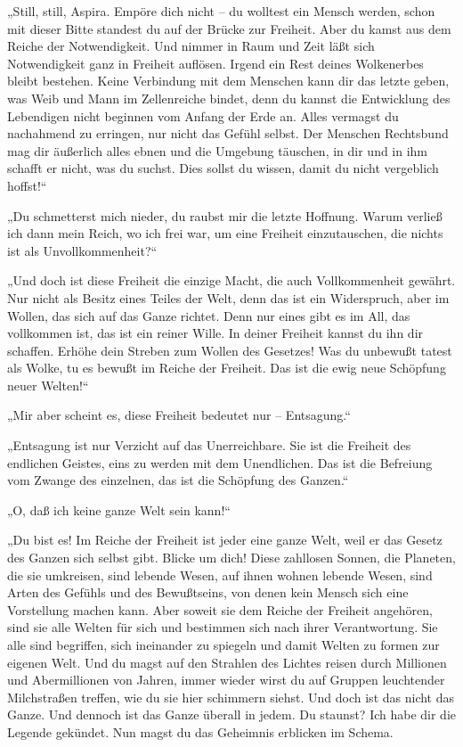 „Still, still, Aspira. Empöre dich nicht – du wolltest ein Mensch
werden, schon mit dieser Bitte standest du auf der Brücke zur
Freiheit. Aber du kamst aus dem Reiche der Notwendigkeit. Und
nimmer in Raum und Zeit läßt sich Notwendigkeit ganz in Freiheit
auflösen. Irgend ein Rest deines Wolkenerbes bleibt bestehen. Keine
Verbindung mit dem Menschen kann dir das letzte geben, was Weib und
Mann im Zellenreiche bindet, denn du kannst die Entwicklung des
Lebendigen nicht beginnen vom Anfang der Erde an. Alles vermagst du
nachahmend zu erringen, nur nicht das Gefühl selbst. Der Menschen
Rechtsbund mag dir äußerlich alles ebnen und die Umgebung täuschen,
in dir und in ihm schafft er nicht, was du suchst. Dies sollst du
wissen, damit du nicht vergeblich hoffst!“

„Du schmetterst mich nieder, du raubst mir die letzte Hoffnung.
Warum verließ ich dann mein Reich, wo ich frei war, um eine
Freiheit einzutauschen, die nichts ist als Unvollkommenheit?“

„Und doch ist diese Freiheit die einzige Macht, die auch
Vollkommenheit gewährt. Nur nicht als Besitz eines Teiles der Welt,
denn das ist ein Widerspruch, aber im Wollen, das sich auf das
Ganze richtet. Denn nur eines gibt es im All, das vollkommen ist,
das ist ein reiner Wille. In deiner Freiheit kannst du ihn dir
schaffen. Erhöhe dein Streben zum Wollen des Gesetzes! Was du
unbewußt tatest als Wolke, tu es bewußt im Reiche der Freiheit. Das
ist die ewig neue Schöpfung neuer Welten!“

„Mir aber scheint es, diese Freiheit bedeutet nur – Entsagung.“

„Entsagung ist nur Verzicht auf das Unerreichbare. Sie ist die
Freiheit des endlichen Geistes, eins zu werden mit dem Unendlichen.
Das ist die Befreiung vom Zwange des einzelnen, das ist die
Schöpfung des Ganzen.“

„O, daß ich keine ganze Welt sein kann!“

„Du bist es! Im Reiche der Freiheit ist jeder eine ganze Welt, weil
er das Gesetz des Ganzen sich selbst gibt. Blicke um dich! Diese
zahllosen Sonnen, die Planeten, die sie umkreisen, sind lebende
Wesen, auf ihnen wohnen lebende Wesen, sind Arten des Gefühls und
des Bewußtseins, von denen kein Mensch sich eine Vorstellung machen
kann. Aber soweit sie dem Reiche der Freiheit angehören, sind sie
alle Welten für sich und bestimmen sich nach ihrer Verantwortung.
Sie alle sind begriffen, sich ineinander zu spiegeln und damit
Welten zu formen zur eigenen Welt. Und du magst auf den Strahlen
des Lichtes reisen durch Millionen und Abermillionen von Jahren,
immer wieder wirst du auf Gruppen leuchtender Milchstraßen treffen,
wie du sie hier schimmern siehst. Und doch ist das nicht das Ganze.
Und dennoch ist das Ganze überall in jedem. Du staunst? Ich habe
dir die Legende gekündet. Nun magst du das Geheimnis erblicken im
Schema.

